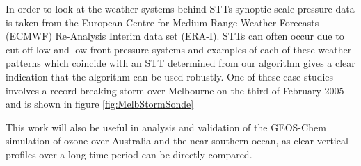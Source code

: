 In order to look at the weather systems behind STTs synoptic scale pressure data is taken from the European Centre for Medium-Range Weather Forecasts (ECMWF) Re-Analysis Interim data set (ERA-I).
STTs can often occur due to cut-off low and low front pressure systems and examples of each of these weather patterns which coincide with an STT determined from our algorithm gives a clear indication that the algorithm can be used robustly.
One of these case studies involves a record breaking storm over Melbourne on the third of February 2005 and is shown in figure \ref{fig:MelbStormSonde}

This work will also be useful in analysis and validation of the GEOS-Chem simulation of ozone over Australia and the near southern ocean, as clear vertical profiles over a long time period can be directly compared.